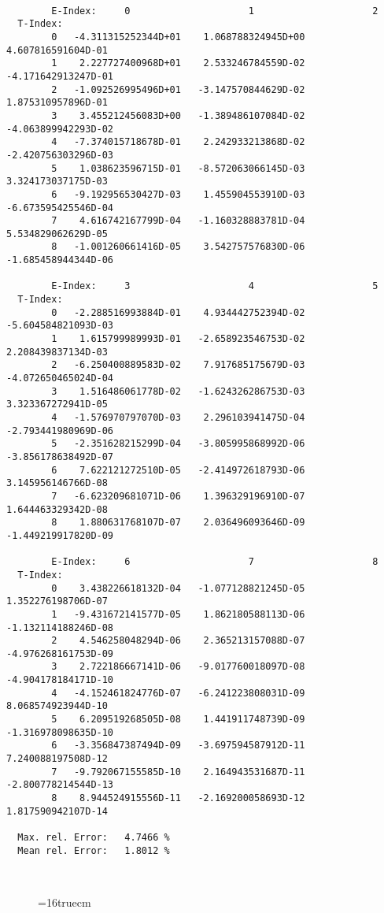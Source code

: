 \documentclass[12pt]{article}
\begin{document}
\begin{small}\begin{verbatim}

        E-Index:     0                     1                     2
  T-Index:
        0   -4.311315252344D+01    1.068788324945D+00    4.607816591604D-01
        1    2.227727400968D+01    2.533246784559D-02   -4.171642913247D-01
        2   -1.092526995496D+01   -3.147570844629D-02    1.875310957896D-01
        3    3.455212456083D+00   -1.389486107084D-02   -4.063899942293D-02
        4   -7.374015718678D-01    2.242933213868D-02   -2.420756303296D-03
        5    1.038623596715D-01   -8.572063066145D-03    3.324173037175D-03
        6   -9.192956530427D-03    1.455904553910D-03   -6.673595425546D-04
        7    4.616742167799D-04   -1.160328883781D-04    5.534829062629D-05
        8   -1.001260661416D-05    3.542757576830D-06   -1.685458944344D-06

        E-Index:     3                     4                     5
  T-Index:
        0   -2.288516993884D-01    4.934442752394D-02   -5.604584821093D-03
        1    1.615799989993D-01   -2.658923546753D-02    2.208439837134D-03
        2   -6.250400889583D-02    7.917685175679D-03   -4.072650465024D-04
        3    1.516486061778D-02   -1.624326286753D-03    3.323367272941D-05
        4   -1.576970797070D-03    2.296103941475D-04   -2.793441980969D-06
        5   -2.351628215299D-04   -3.805995868992D-06   -3.856178638492D-07
        6    7.622121272510D-05   -2.414972618793D-06    3.145956146766D-08
        7   -6.623209681071D-06    1.396329196910D-07    1.644463329342D-08
        8    1.880631768107D-07    2.036496093646D-09   -1.449219917820D-09

        E-Index:     6                     7                     8
  T-Index:
        0    3.438226618132D-04   -1.077128821245D-05    1.352276198706D-07
        1   -9.431672141577D-05    1.862180588113D-06   -1.132114188246D-08
        2    4.546258048294D-06    2.365213157088D-07   -4.976268161753D-09
        3    2.722186667141D-06   -9.017760018097D-08   -4.904178184171D-10
        4   -4.152461824776D-07   -6.241223808031D-09    8.068574923944D-10
        5    6.209519268505D-08    1.441911748739D-09   -1.316978098635D-10
        6   -3.356847387494D-09   -3.697594587912D-11    7.240088197508D-12
        7   -9.792067155585D-10    2.164943531687D-11   -2.800778214544D-13
        8    8.944524915556D-11   -2.169200058693D-12    1.817590942107D-14

  Max. rel. Error:   4.7466 %
  Mean rel. Error:   1.8012 %



\end{verbatim}\end{small}
\begin{figure} \label{2.2a}
\epsfxsize=16truecm
\end{figure}
\newpage
\end{document}

